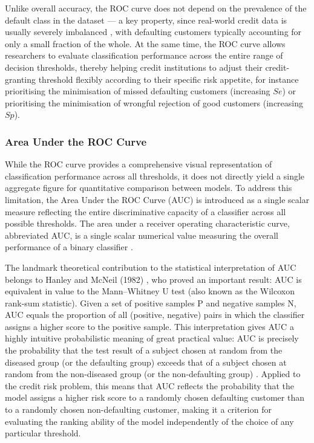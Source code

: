 \vspace{1em}
Unlike overall accuracy, the ROC curve does not depend on the prevalence of the default class in the dataset — a key property, since real-world credit data is usually severely imbalanced \cite{chawla2002smote}, with defaulting customers typically accounting for only a small fraction of the whole. At the same time, the ROC curve allows researchers to evaluate classification performance across the entire range of decision thresholds, thereby helping credit institutions to adjust their credit-granting threshold flexibly according to their specific risk appetite, for instance prioritising the minimisation of missed defaulting customers (increasing $Se$) or prioritising the minimisation of wrongful rejection of good customers (increasing $Sp$).


\subsubsection{Area Under the ROC Curve}
\noindent
While the ROC curve provides a comprehensive visual representation of classification performance across all thresholds, it does not directly yield a single aggregate figure for quantitative comparison between models. To address this limitation, the Area Under the ROC Curve (AUC) is introduced as a single scalar measure reflecting the entire discriminative capacity of a classifier across all possible thresholds. The area under a receiver operating characteristic curve, abbreviated AUC, is a single scalar numerical value measuring the overall performance of a binary classifier \cite{hanley1982meaning}.

The landmark theoretical contribution to the statistical interpretation of AUC belongs to Hanley and McNeil (1982) \cite{hanley1982meaning}, who proved an important result: AUC is equivalent in value to the Mann--Whitney U test (also known as the Wilcoxon rank-sum statistic). Given a set of positive samples P and negative samples N, AUC equals the proportion of all (positive, negative) pairs in which the classifier assigns a higher score to the positive sample. This interpretation gives AUC a highly intuitive probabilistic meaning of great practical value: AUC is precisely the probability that the test result of a subject chosen at random from the diseased group (or the defaulting group) exceeds that of a subject chosen at random from the non-diseased group (or the non-defaulting group) \cite{bamber1975area}. Applied to the credit risk problem, this means that AUC reflects the probability that the model assigns a higher risk score to a randomly chosen defaulting customer than to a randomly chosen non-defaulting customer, making it a criterion for evaluating the ranking ability of the model independently of the choice of any particular threshold.


